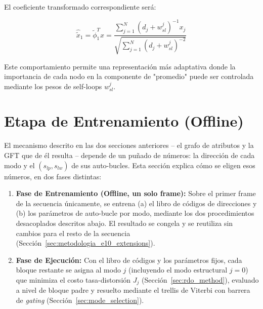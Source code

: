     El coeficiente transformado correspondiente será:
    
    \begin{equation}
        \hat{\tilde{x}}_1 = \tilde{\phi}_1^T x = \frac{\sum_{j=1}^{N} (d_j + w^j_{sl})^{-1} x_j}{\sqrt{\sum_{j=1}^{N} (d_j + w^j_{sl})^{-2}}}
    \end{equation}
    
    Este comportamiento permite una representación más adaptativa donde la importancia de cada nodo en la componente de "promedio" puede ser controlada mediante los pesos de self-loops $w^j_{sl}$.

\section{Etapa de Entrenamiento (Offline)}\label{sec:training_stage}

    El mecanismo descrito en las dos secciones anteriores -- el grafo de atributos y la GFT que
    de él resulta -- depende de un puñado de números: la dirección de cada modo y el
    $(s_{lp}, s_{lw})$ de sus auto-bucles. Esta sección explica cómo se eligen esos números, en
    dos fases distintas:

    \begin{enumerate}
        \item \textbf{Fase de Entrenamiento (Offline, un solo frame):} Sobre el primer frame de la
        secuencia únicamente, se entrena (a) el libro de códigos de direcciones y (b) los
        parámetros de auto-bucle por modo, mediante los dos procedimientos desacoplados descritos
        abajo. El resultado se congela y se reutiliza sin cambios para el resto de la secuencia
        (Sección~\ref{sec:metodologia_e10_extensions}).
        \item \textbf{Fase de Ejecución:} Con el libro de códigos y los parámetros fijos, cada
        bloque restante se asigna al modo $j$ (incluyendo el modo estructural $j=0$) que minimiza
        el costo tasa-distorsión $J_j$ (Sección~\ref{sec:rdo_method}), evaluado a nivel de bloque
        padre y resuelto mediante el trellis de Viterbi con barrera de \textit{gating}
        (Sección~\ref{sec:mode_selection}).
    \end{enumerate}

